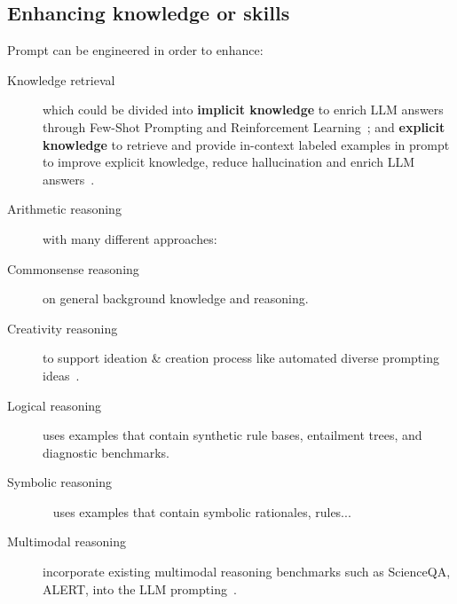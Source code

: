 \documentclass[acmsmall]{acmart}
\begin{document}
\subsection{Enhancing knowledge or skills}
Prompt can be engineered in order to enhance:
\begin{description}
    
    \item [Knowledge retrieval] which could be divided into \textbf{implicit knowledge} to enrich LLM answers through Few-Shot Prompting and Reinforcement Learning~\citep{wangPINTOFaithfulLanguage2022, liuRainierReinforcedKnowledge2022, liuGeneratedKnowledgePrompting2022}; and \textbf{explicit knowledge} to retrieve and provide in-context labeled examples in prompt to improve explicit knowledge, reduce hallucination and enrich LLM answers~\citep{yangLogicSolverInterpretableMath2022, suSelectiveAnnotationMakes2022}.

    \item [Arithmetic reasoning] with many different approaches:\citep{zhouTeachingAlgorithmicReasoning2022, lewkowyczSolvingQuantitativeReasoning2022, chenProgramThoughtsPrompting2022, huangLargeLanguageModels2022, liAdvanceMakingLanguage2022, gaoPALProgramaidedLanguage2023, shiLanguageModelsAre2022, beurer-kellnerPromptingProgrammingQuery2022}

    \item [Commonsense reasoning] on general background knowledge and reasoning.
~\citep{wangPINTOFaithfulLanguage2022, madaanLanguageModelsCode2022, liuRainierReinforcedKnowledge2022, kojimaLargeLanguageModels2023, wangSelfConsistencyImprovesChain2022, liuGeneratedKnowledgePrompting2022}

    \item [Creativity reasoning] to support ideation \& creation process like automated diverse prompting ideas~\citep{leePromptiverseScalableGeneration2022, rhyscoxDirectedDiversityLeveraging2021, schickPEERCollaborativeLanguage2022, gozalo-brizuelaChatGPTNotAll2023}.

    \item [Logical reasoning] uses examples that contain synthetic rule bases, entailment trees, and diagnostic benchmarks.
~\citep{creswellSelectionInferenceExploitingLarge2022, creswellFaithfulReasoningUsing2022}
        
    \item [Symbolic reasoning]~\citep{gaoPALProgramaidedLanguage2023, khotDecomposedPromptingModular2022, kojimaLargeLanguageModels2023, wangSelfConsistencyImprovesChain2022} uses examples that contain symbolic rationales, rules...

    \item [Multimodal reasoning] incorporate existing multimodal reasoning benchmarks such as ScienceQA, ALERT, into the LLM prompting~\citep{zhangMultimodalAnalogicalReasoning2023, luLearnExplainMultimodal2022}.

\end{description}
        
\end{document}
